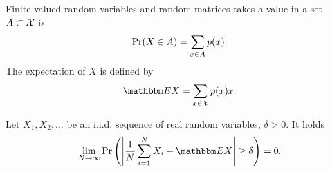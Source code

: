 \begin{section}{Finite-valued random variables and random matrices}
  takes a value in a set $A \subset {\mathcal X}$ is 
  \begin{align}
   \mathrm{Pr}(X \in A) = \sum_{x \in A} p(x).
  \end{align}
  The expectation of $X$ is defined by 
  \begin{align}
   \bbmE X = \sum_{x \in \cX} p(x) x.
  \end{align}
   \begin{proposition}
    Let $X_1,X_2,\dots$ be an i.i.d. sequence of real random variables, $\delta > 0$. It holds
    \begin{align}
     \lim_{N \rightarrow \infty} \prob\left(\left| \frac{1}{N} \sum_{i=1}^N X_i - \bbmE X\right | \geq \delta \right) = 0. 
    \end{align}
   \end{proposition}
 \end{section}

